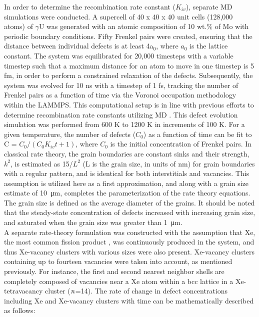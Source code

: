 \documentclass[preprint,12pt]{elsarticle}
\begin{document}
\indent In order to determine the recombination rate constant ($K_{iv}$), separate MD simulations were conducted. A supercell of 40 x 40 x 40 unit cells (128,000 atoms) of $\gamma$U was generated with an atomic composition of 10 wt.$\%$ of Mo with periodic boundary conditions. Fifty Frenkel pairs were created, ensuring that the distance between individual defects is at least 4a$_{0}$, where $a_{0}$ is the lattice constant. The system was equilibrated for 20,000 timesteps with a variable timestep such that a maximum distance for an atom to move in one timestep is 5 fm, in order to perform a constrained relaxation of the defects. Subsequently, the system was evolved for 10 ns with a timestep of 1 fs, tracking the number of Frenkel pairs as a function of time via the Voronoi occupation methodology within the LAMMPS. This computational setup is in line with previous efforts to determine recombination rate constants utilizing MD \cite{zhang2012atomistic}. This defect evolution simulation was performed from 600 K to 1200 K in increments of 100 K. For a given temperature, the number of defects ($C_{0}$) as a function of time can be fit to C = $C_{0}/(C_{0}K_{iv}t +1)$, where $C_{0}$ is the initial concentration of Frenkel pairs. In classical rate theory, the grain boundaries are constant sinks and their strength, $k^{2}$, is estimated as 15/$L^{2}$ (L is the grain size, in units of nm) for grain boundaries with a regular pattern, and is identical for both interstitials and vacancies. This assumption is utilized here as a first approximation, and along with a grain size estimate of \SI{10}{\micro\metre}, completes the parameterization of the rate theory equations. The grain size is defined as the average diameter of the grains. It should be noted that the steady-state concentration of defects increased with increasing grain size, and saturated when the grain size was greater than \SI{1}{\micro\metre}. \\
\indent A separate rate-theory formulation was constructed with the assumption that Xe, the most common fission product \cite{kleykamp1985chemical}, was continuously produced in the system, and thus Xe-vacancy clusters with various sizes were also present. Xe-vacancy clusters containing up to fourteen vacancies were taken into account, as mentioned previously. For instance, the first and second nearest neighbor shells are completely composed of vacancies near a Xe atom within a bcc lattice in a Xe-tetravacancy cluster ($\it{n}$=14). The rate of change in defect concentrations including Xe and Xe-vacancy clusters with time can be mathematically described as follows:
\end{document}
